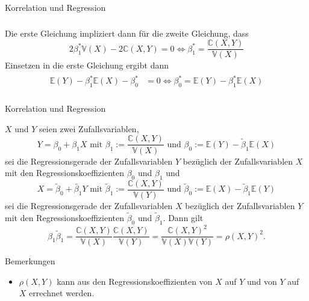 \documentclass[
  8pt,
  ignorenonframetext,
]{beamer}
\providecommand{\tightlist}{%
  \setlength{\itemsep}{0pt}\setlength{\parskip}{0pt}}
\begin{document}
\begin{frame}{Korrelation und Regression}
\begin{align}
\begin{split}
\end{split}
\end{align} Die erste Gleichung impliziert dann für die zweite
Gleichung, dass \begin{equation}
2\beta_1^*\mathbb{V}(X) - 2\mathbb{C}(X,Y) = 0 \Leftrightarrow \beta_1^* = \frac{\mathbb{C}(X,Y)}{\mathbb{V}(X)}
\end{equation} Einsetzen in die erste Gleichung ergibt dann
\begin{align}
\begin{split}
\mathbb{E}(Y) - \beta_1^* \mathbb{E}(X) - \beta_0^* & = 0
\Leftrightarrow
\beta_0^*   = \mathbb{E}(Y) - \beta_1^* \mathbb{E}(X) \\
\end{split}
\end{align}
\end{frame}

\begin{frame}{Korrelation und Regression}
\protect\hypertarget{korrelation-und-regression-4}{}
\footnotesize
\begin{theorem}
\normalfont
\justifying
$X$ und $Y$ seien zwei Zufallsvariablen,
\begin{equation}
Y = \beta_0 + \beta_1 X
\mbox{ mit }
\beta_1 := \frac{\mathbb{C}(X,Y)}{\mathbb{V}(X)}
\mbox{ und }
\beta_0 := \mathbb{E}(Y) -\tilde{\beta}_1\mathbb{E}(X)
\end{equation}
sei die Regressionsgerade der Zufallsvariablen $Y$ bezüglich der Zufallsvariablen
$X$ mit den Regressionskoeffizienten  $\beta_0$ und $\beta_1$ und
\begin{equation}
X = \tilde{\beta}_0 + \tilde{\beta_1} Y
\mbox{ mit }
\tilde{\beta}_1 := \frac{\mathbb{C}(X,Y)}{\mathbb{V}(Y)}
\mbox{ und }
\tilde{\beta}_0 := \mathbb{E}(X) -\tilde{\beta}_1\mathbb{E}(Y)
\end{equation}
sei die Regressionsgerade der Zufallsvariablen $X$ bezüglich der Zufallsvariablen
$Y$ mit den Regressionskoeffizienten $\tilde{\beta}_0$ und $\tilde{\beta}_1$. Dann gilt
\begin{equation}
\beta_1 \tilde{\beta}_1
= \frac{\mathbb{C}(X,Y)}{\mathbb{V}(X)}\frac{\mathbb{C}(X,Y)}{\mathbb{V}(Y)}
= \frac{\mathbb{C}(X,Y)^2}{\mathbb{V}(X)\mathbb{V}(Y)}
= \rho(X,Y)^2.
\end{equation}
\end{theorem}

Bemerkungen

\begin{itemize}
\tightlist
\item
  \(\rho(X,Y)\) kann aus den Regressionskoeffizienten von \(X\) auf
  \(Y\) und von \(Y\) auf \(X\) errechnet werden.
\end{itemize}
\end{frame}
\end{document}
